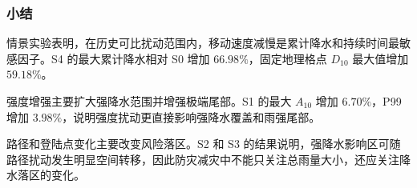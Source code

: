 \subsubsection{小结}

情景实验表明，在历史可比扰动范围内，移动速度减慢是累计降水和持续时间最敏感因子。S4 的最大累计降水相对 S0 增加 $66.98\%$，固定地理格点 $D_{10}$ 最大值增加 $59.18\%$。

强度增强主要扩大强降水范围并增强极端尾部。S1 的最大 $A_{10}$ 增加 $6.70\%$，P99 增加 $3.98\%$，说明强度扰动更直接影响强降水覆盖和雨强尾部。

路径和登陆点变化主要改变风险落区。S2 和 S3 的结果说明，强降水影响区可随路径扰动发生明显空间转移，因此防灾减灾中不能只关注总雨量大小，还应关注降水落区的变化。
